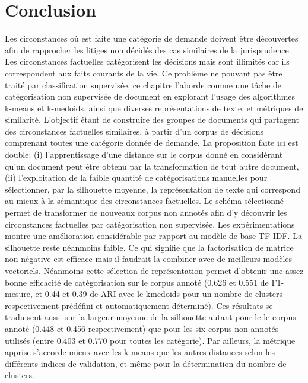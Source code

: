 \section{Conclusion}
\label{sec:similarite:conclusion}
Les circonstances où est faite une catégorie de demande doivent être découvertes afin de rapprocher les litiges non décidés des cas similaires de la jurisprudence. Les circonstances factuelles catégorisent les décisions mais sont illimités car ils correspondent aux faits courants de la vie. Ce problème ne pouvant pas être traité par classification supervisée, ce chapitre l'aborde comme une tâche de catégorisation non supervisée de document en explorant l'usage des algorithmes k-means et k-medoids, ainsi que diverses représentations de texte, et métriques de similarité. L'objectif étant de construire des groupes de documents qui partagent des circonstances factuelles similaires, à partir d'un corpus de décisions comprenant toutes une catégorie donnée de demande. La proposition faite ici est double: (i) l'apprentissage d'une distance sur le corpus donné en considérant qu'un document peut être obtenu par la transformation de tout autre document, (ii) l'exploitation de la faible quantité de catégorisations manuelles  pour sélectionner, par la silhouette moyenne, la représentation de texte qui correspond au mieux à la sémantique des circonstances factuelles. Le schéma sélectionné permet de transformer de nouveaux corpus non annotés afin d'y découvrir les circonstances factuelles par catégorisation non supervisée. Les expérimentations montre une amélioration considérable par rapport au modèle de base TF-IDF. La silhouette reste néanmoins faible. Ce qui signifie que la factorisation de matrice non négative est efficace mais il faudrait la combiner avec de meilleurs modèles vectoriels. Néanmoins cette sélection de représentation permet d'obtenir une assez bonne efficacité de catégorisation sur le corpus annoté (0.626 et 0.551 de F1-mesure, et 0.44 et 0.39 de ARI avec le kmedoids pour un nombre de clusters respectivement prédéfini et automatiquement déterminé). Ces résultats se traduisent aussi sur la largeur moyenne de la silhouette autant pour le le corpus annoté (0.448 et 0.456 respectivement) que pour les six corpus non annotés utilisés (entre 0.403 et 0.770 pour toutes les catégorie). Par ailleurs, la métrique apprise s'accorde mieux avec les k-means que les autres distances selon les différents indices de validation, et même pour la détermination du nombre de clusters.


